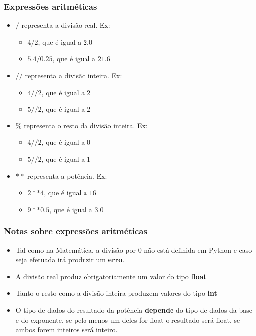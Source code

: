 \documentclass{beamer}
\begin{document}
\begin{frame}
    \frametitle{Expressões aritméticas}
        \begin{itemize}
            \item $/$ representa a divisão real. Ex:
            \begin{itemize}
                \item $4/2$, que é igual a $2.0$
                \item $5.4/0.25$, que é igual a $21.6$
            \end{itemize}
            \item $//$ representa a divisão inteira. Ex:
            \begin{itemize}
                \item $4//2$, que é igual a $2$
                \item $5//2$, que é igual a $2$
            \end{itemize}
            \item $\%$ representa o resto da divisão inteira. Ex:
            \begin{itemize}
                \item $4//2$, que é igual a $0$
                \item $5//2$, que é igual a $1$
            \end{itemize}
            \item $**$ representa a potência. Ex:
            \begin{itemize}
                \item $2**4$, que é igual a $16$
                \item $9**0.5$, que é igual a $3.0$
            \end{itemize}
        \end{itemize}
\end{frame}

\begin{frame}
    \frametitle{Notas sobre expressões aritméticas}
        \begin{itemize}
            \item Tal como na Matemática, a divisão por $0$ não está definida em
                Python e caso seja efetuada irá produzir um \textbf{erro}.
            \item A divisão real produz obrigatoriamente um valor do tipo \textbf{float}
            \item Tanto o resto como a divisão inteira produzem valores do tipo
            \textbf{int}
            \item O tipo de dados do resultado da potência \textbf{depende} do 
            tipo de dados da base e do exponente, se pelo menos um deles for 
            float o resultado será float, se ambos forem inteiros será inteiro.
    
        \end{itemize}
\end{frame}
\end{document}
